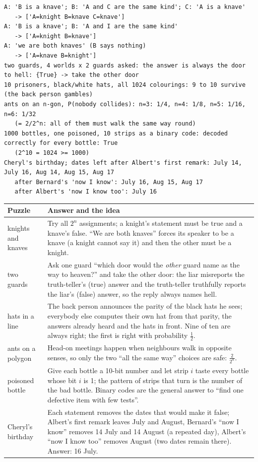 \documentclass[10pt,a4paper,openany,oneside]{report}
\begin{document}
\begin{lstlisting}[style=out,basicstyle=\ttfamily\fontsize{7.2}{8.6}\selectfont,title={ap\_riddles.py: output}]
A: 'B is a knave'; B: 'A and C are the same kind'; C: 'A is a knave'
   -> ['A=knight B=knave C=knave']
A: 'B is a knave'; B: 'A and I are the same kind'
   -> ['A=knight B=knave']
A: 'we are both knaves' (B says nothing)
   -> ['A=knave B=knight']
two guards, 4 worlds x 2 guards asked: the answer is always the door to hell: {True} -> take the other door
10 prisoners, black/white hats, all 1024 colourings: 9 to 10 survive (the back person gambles)
ants on an n-gon, P(nobody collides): n=3: 1/4, n=4: 1/8, n=5: 1/16, n=6: 1/32
   (= 2/2^n: all of them must walk the same way round)
1000 bottles, one poisoned, 10 strips as a binary code: decoded correctly for every bottle: True
   (2^10 = 1024 >= 1000)
Cheryl's birthday; dates left after Albert's first remark: July 14, July 16, Aug 14, Aug 15, Aug 17
   after Bernard's 'now I know': July 16, Aug 15, Aug 17
   after Albert's 'now I know too': July 16
\end{lstlisting}
\begin{center}\small
\begin{xltabular}{\textwidth}{@{}L{3.0cm}Y@{}}
\toprule
\textbf{Puzzle} & \textbf{Answer and the idea}\\
\midrule\endhead
knights and knaves & Try all $2^n$ assignments; a knight's statement must be true and a knave's false. ``We are both knaves'' forces its speaker to be a knave (a knight cannot say it) and then the other must be a knight.\\
two guards & Ask one guard ``which door would the \emph{other} guard name as the way to heaven?'' and take the other door: the liar misreports the truth-teller's (true) answer and the truth-teller truthfully reports the liar's (false) answer, so the reply always names hell.\\
hats in a line & The back person announces the parity of the black hats he sees; everybody else computes their own hat from that parity, the answers already heard and the hats in front. Nine of ten are always right; the first is right with probability $\frac12$.\\
ants on a polygon & Head-on meetings happen when neighbours walk in opposite senses, so only the two ``all the same way'' choices are safe: $\frac2{2^n}$.\\
poisoned bottle & Give each bottle a 10-bit number and let strip $i$ taste every bottle whose bit $i$ is 1; the pattern of strips that turn is the number of the bad bottle. Binary codes are the general answer to ``find one defective item with few tests''.\\
Cheryl's birthday & Each statement removes the dates that would make it false; Albert's first remark leaves July and August, Bernard's ``now I know'' removes 14 July and 14 August (a repeated day), Albert's ``now I know too'' removes August (two dates remain there). Answer: 16 July.\\
\bottomrule
\end{xltabular}
\end{center}
\end{document}
